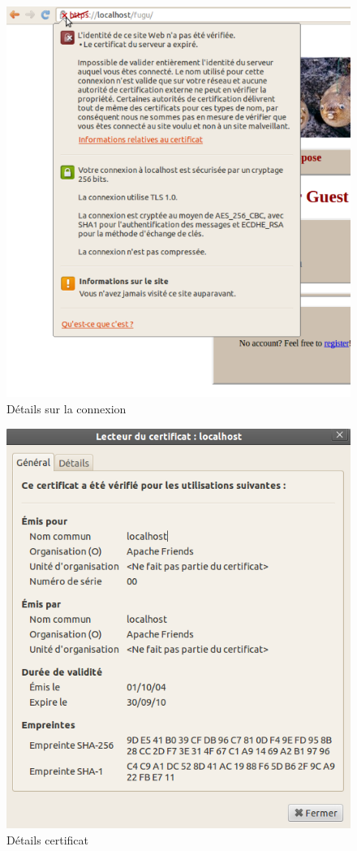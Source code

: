 \documentclass[a4paper]{article}
\begin{document}
\begin{figure}[!ht]
	\centering
	\includegraphics[scale=0.5]{Fugu_HTTPS.png}
	\caption{\label{certif2} Détails sur la connexion}
\end{figure}

\newpage

\begin{figure}[!ht]
	\centering
	\includegraphics[scale=0.5]{Certif.png}
	\caption{\label{certif3} Détails certificat}
\end{figure}
\end{document}
